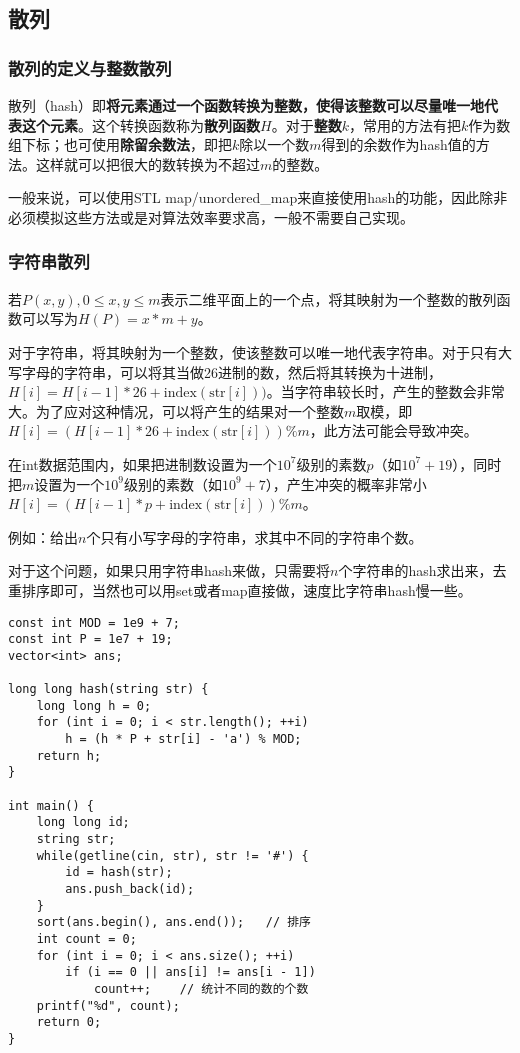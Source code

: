 \subsection{散列}

\subsubsection{散列的定义与整数散列}

散列（hash）即\textbf{将元素通过一个函数转换为整数，使得该整数可以尽量唯一地代表这个元素}。这个转换函数称为\textbf{散列函数$H$}。对于\textbf{整数$k$}，常用的方法有把$k$作为数组下标；也可使用\textbf{除留余数法}，即把$k$除以一个数$m$得到的余数作为hash值的方法。这样就可以把很大的数转换为不超过$m$的整数。

一般来说，可以使用STL map/unordered\_map来直接使用hash的功能，因此除非必须模拟这些方法或是对算法效率要求高，一般不需要自己实现。

\subsubsection{字符串散列}

若$P(x,y),0\leq x,y\leq m$表示二维平面上的一个点，将其映射为一个整数的散列函数可以写为$H(P)=x*m+y$。

对于字符串，将其映射为一个整数，使该整数可以唯一地代表字符串。对于只有大写字母的字符串，可以将其当做26进制的数，然后将其转换为十进制，$H[i]=H[i-1]*26+\textrm{index}(\textrm{str}[i]))$。当字符串较长时，产生的整数会非常大。为了应对这种情况，可以将产生的结果对一个整数$m$取模，即$H[i]=(H[i-1]*26+\textrm{index}(\textrm{str}[i]))\%m$，此方法可能会导致冲突。

在int数据范围内，如果把进制数设置为一个$10^7$级别的素数$p$（如$10^7+19$），同时把$m$设置为一个$10^9$级别的素数（如$10^9+7$），产生冲突的概率非常小$H[i]=(H[i-1]*p+\textrm{index}(\textrm{str}[i]))\%m$。

例如：给出$n$个只有小写字母的字符串，求其中不同的字符串个数。

对于这个问题，如果只用字符串hash来做，只需要将$n$个字符串的hash求出来，去重排序即可，当然也可以用set或者map直接做，速度比字符串hash慢一些。

\begin{lstlisting}
const int MOD = 1e9 + 7;
const int P = 1e7 + 19;
vector<int> ans;

long long hash(string str) {
	long long h = 0;
	for (int i = 0; i < str.length(); ++i) 
		h = (h * P + str[i] - 'a') % MOD;
	return h;
}

int main() {
	long long id;
	string str;
	while(getline(cin, str), str != '#') {
		id = hash(str);
		ans.push_back(id);
	}
	sort(ans.begin(), ans.end());	// 排序
	int count = 0;
	for (int i = 0; i < ans.size(); ++i)
		if (i == 0 || ans[i] != ans[i - 1])
			count++;	// 统计不同的数的个数
	printf("%d", count);
	return 0;
}
\end{lstlisting}

